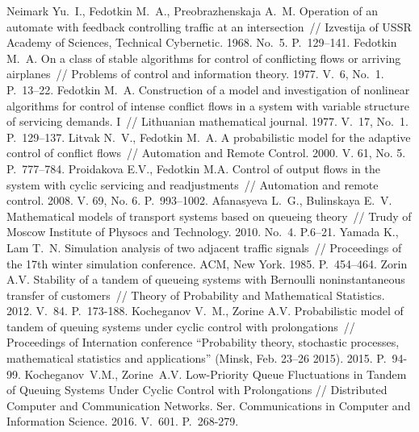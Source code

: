 \documentclass[60x84/16,10pt]{dccn}
\begin{document}
{\begin{thebibliography}{10}
 Neimark Yu.~I., Fedotkin M.~A., Preobrazhenskaja A.~M. Operation of an automate
  with feedback controlling traffic at an intersection~// Izvestija of USSR Academy of Sciences,
  Technical Cybernetic. 1968. No.~5. P.~129--141.
  Fedotkin M.~A. On a class of stable algorithms for control of conflicting flows or arriving
  airplanes~// Problems of control and information theory. 1977. V.~6, No.~1. P.~13--22.
  Fedotkin M.~A. Construction of a model and investigation of nonlinear algorithms for control of
  intense conflict flows in a system with variable structure of servicing demands. I~// Lithuanian
  mathematical journal. 1977. V.~17, No.~1. P.~129--137.
%
  Litvak N.~V., Fedotkin M.~A. A probabilistic model for the
  adaptive control of conflict flows~// Automation and Remote Control. 2000. V. 61, No. 5. P.~777--784.
%
  Proidakova E.V., Fedotkin M.A. Control of output flows in the system with cyclic servicing and
  readjustments~// Automation and remote control. 2008. V. 69, No. 6. P.~993--1002.
%
  Afanasyeva L.~G., Bulinskaya E.~V. Mathematical models of transport systems based on queueing
  theory~// Trudy of Moscow Institute of Physocs and Technology. 2010. No.~4. P.6--21. 
  Yamada K., Lam T.~N. Simulation analysis of two adjacent traffic signals~// Proceedings of the
  17th winter simulation conference. ACM, New York. 1985. P.~454--464.
%
  Zorin A.V. Stability of a tandem of queueing systems with Bernoulli noninstantaneous transfer of
  customers~// Theory of Probability and Mathematical Statistics. 2012. V.~84. P.~173-188.
  Kocheganov V.~M., Zorine A.V. Probabilistic model of tandem of queuing systems under cyclic
  control with prolongations~// Proceedings of Internation conference ``Probability theory, stochastic processes, mathematical statistics
  and applications'' (Minsk, Feb. 23--26 2015). 2015. P.~94-99.
Kocheganov~V.M., Zorine~A.V. Low-Priority Queue Fluctuations in Tandem of Queuing Systems Under Cyclic Control with Prolongations // Distributed Computer and Communication Networks. Ser. Communications in Computer and Information Science. 2016. V.~601. P.~268-279.
\end{thebibliography}

% 
% 


} %
\end{document}
